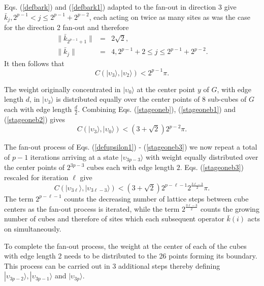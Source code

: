 \documentclass[twocolumn,amsmath,amssymb]{revtex4-1}
\begin{document}
Eqs. (\ref{defbark}) and (\ref{defbark1}) adapted to the fan-out in direction 3
give $\bar{k}_j, 2^{p-1} < j \le 2^{p-1} + 2^{p-2}$, each acting on twice as
many sites as was the case for the direction 2 fan-out and therefore
\begin{subequations}
\begin{eqnarray}
       \label{defbarkn3}
 \!\!\!\!\!\!\!\!\!\!\!\!\!\!\!\!\!      \parallel \bar{k}_ {2^{p-1} + 1} \parallel  &=&  2\sqrt{2}, \\
   \label{defbark1n3}
\!\!\!\!\!\!\!\!\!\!\!\!\!\!\!\!\!  \parallel \bar{k}_j\parallel &=&   4, 2^{p-1}+ 2 \le j \le 2^{p-1} + 2^{p-2}.
\end{eqnarray}
\end{subequations}
It then follows that
\begin{equation}
  \label{stageoneb2}
  C( |\upsilon_3 \rangle , |\upsilon_2 \rangle ) <2^{p-1} \pi.
\end{equation}

The weight originally concentrated in $|\upsilon_0 \rangle $ at the center point $y$ of
$G$, with edge length $d$, in $|\upsilon_3 \rangle $ is distributed equally over the center points
of 8 sub-cubes of $G$ each with edge length $\frac{d}{2}$. 
Combining Eqs. (\ref{stageoneb}), (\ref{stageoneb1}) and (\ref{stageoneb2}) gives
\begin{equation}
  \label{stageoneb3}
  C( |\upsilon_3 \rangle , |\upsilon_0 \rangle ) < (3+ \sqrt{2}) 2^{p-2} \pi.
\end{equation}

The fan-out process of Eqs. (\ref{defupsilon1}) - (\ref{stageoneb3}) we now repeat 
a total of $p-1$ iterations arriving at a state $|\upsilon_{3 p - 3} \rangle $ with weight
equally distributed over the center points of $2^{3 p - 3}$ cubes each with edge length
$2$.
Eqs. (\ref{stageoneb3}) rescaled for iteration $\ell$ give
\begin{equation}
\label{iterationell}
C( |\upsilon_{3 \ell} \rangle , |\upsilon_{3 \ell - 3} \rangle ) < (3+\sqrt{2}) 2^{p-\ell-1} 2^{\frac{3\ell - 3}{2}} \pi.
\end{equation}
The term $2^{p-\ell - 1}$ counts the decreasing number of lattice steps between cube centers as
the fan-out process is iterated, while the term $2^{\frac{3\ell - 3}{2}}$
counts the growing number of cubes and therefore 
of sites which each subsequent operator $\bar{k}(i)$ acts on simultaneously.

To complete the fan-out process, the weight at the center of each of the cubes with edge
length 2 needs to
be distributed to the 26 points forming its boundary.
This process can be carried out in 3 additional steps thereby defining
$|\upsilon_{3p -2} \rangle , |\upsilon_{3p-1} \rangle $ and $|\upsilon_{3p} \rangle $.
\end{document}
